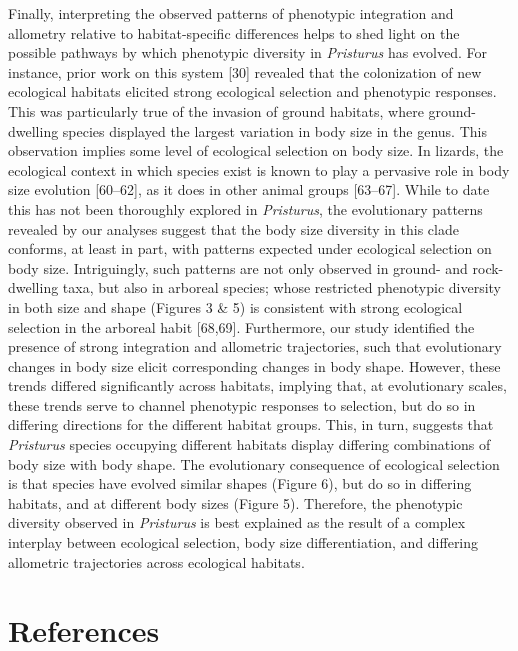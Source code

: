 \documentclass[
  11pt,
]{article}
\begin{document}
Finally, interpreting the observed patterns of phenotypic integration
and allometry relative to habitat-specific differences helps to shed
light on the possible pathways by which phenotypic diversity in
\emph{Pristurus} has evolved. For instance, prior work on this system
{[}30{]} revealed that the colonization of new ecological habitats
elicited strong ecological selection and phenotypic responses. This was
particularly true of the invasion of ground habitats, where
ground-dwelling species displayed the largest variation in body size in
the genus. This observation implies some level of ecological selection
on body size. In lizards, the ecological context in which species exist
is known to play a pervasive role in body size evolution {[}60--62{]},
as it does in other animal groups {[}63--67{]}. While to date this has
not been thoroughly explored in \emph{Pristurus}, the evolutionary
patterns revealed by our analyses suggest that the body size diversity
in this clade conforms, at least in part, with patterns expected under
ecological selection on body size. Intriguingly, such patterns are not
only observed in ground- and rock-dwelling taxa, but also in arboreal
species; whose restricted phenotypic diversity in both size and shape
(Figures 3 \& 5) is consistent with strong ecological selection in the
arboreal habit {[}68,69{]}. Furthermore, our study identified the
presence of strong integration and allometric trajectories, such that
evolutionary changes in body size elicit corresponding changes in body
shape. However, these trends differed significantly across habitats,
implying that, at evolutionary scales, these trends serve to channel
phenotypic responses to selection, but do so in differing directions for
the different habitat groups. This, in turn, suggests that
\emph{Pristurus} species occupying different habitats display differing
combinations of body size with body shape. The evolutionary consequence
of ecological selection is that species have evolved similar shapes
(Figure 6), but do so in differing habitats, and at different body sizes
(Figure 5). Therefore, the phenotypic diversity observed in
\emph{Pristurus} is best explained as the result of a complex interplay
between ecological selection, body size differentiation, and differing
allometric trajectories across ecological habitats.

\newpage

\hypertarget{references}{%
\section*{References}\label{references}}
\end{document}
